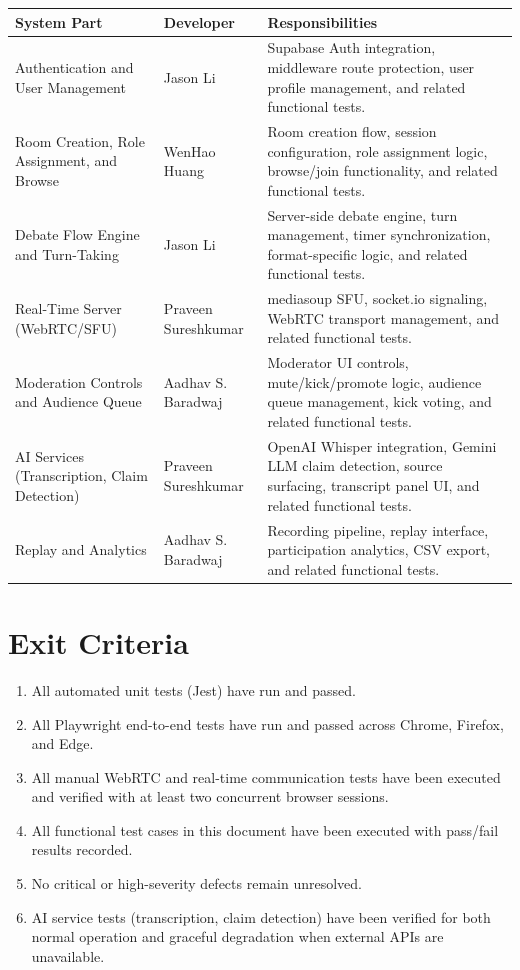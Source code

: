 \documentclass[12pt]{article}
\begin{document}
\begin{tabular}{|p{4cm}|p{3cm}|p{6cm}|}
\hline
\textbf{System Part} & \textbf{Developer} & \textbf{Responsibilities} \\
\hline
Authentication and User Management & Jason Li & Supabase Auth integration, middleware route protection, user profile management, and related functional tests. \\
\hline
Room Creation, Role Assignment, and Browse & WenHao Huang & Room creation flow, session configuration, role assignment logic, browse/join functionality, and related functional tests. \\
\hline
Debate Flow Engine and Turn-Taking & Jason Li & Server-side debate engine, turn management, timer synchronization, format-specific logic, and related functional tests. \\
\hline
Real-Time Server (WebRTC/SFU) & Praveen Sureshkumar & mediasoup SFU, socket.io signaling, WebRTC transport management, and related functional tests. \\
\hline
Moderation Controls and Audience Queue & Aadhav S. Baradwaj & Moderator UI controls, mute/kick/promote logic, audience queue management, kick voting, and related functional tests. \\
\hline
AI Services (Transcription, Claim Detection) & Praveen Sureshkumar & OpenAI Whisper integration, Gemini LLM claim detection, source surfacing, transcript panel UI, and related functional tests. \\
\hline
Replay and Analytics & Aadhav S. Baradwaj & Recording pipeline, replay interface, participation analytics, CSV export, and related functional tests. \\
\hline
\end{tabular}

\section{Exit Criteria}

\begin{enumerate}
    \item All automated unit tests (Jest) have run and passed.
    \item All Playwright end-to-end tests have run and passed across Chrome, Firefox, and Edge.
    \item All manual WebRTC and real-time communication tests have been executed and verified with at least two concurrent browser sessions.
    \item All functional test cases in this document have been executed with pass/fail results recorded.
    \item No critical or high-severity defects remain unresolved.
    \item AI service tests (transcription, claim detection) have been verified for both normal operation and graceful degradation when external APIs are unavailable.
\end{enumerate}
\end{document}
